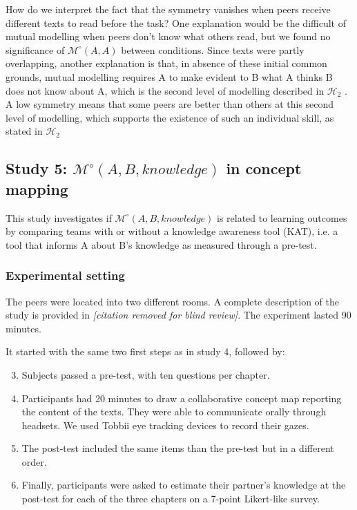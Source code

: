 \documentclass[natbib]{svjour3}
\newcommand{\ie}{i.e.\xspace}
\newcommand{\A}{A\xspace}
\newcommand{\B}{B\xspace}
\newcommand{\Model}[3]{{$\mathcal{M}^{\circ}(#1, #2, #3)$}}
\newcommand{\gModel}[2]{{$\mathcal{M}^{\circ}(#1, #2)$}}
\begin{document}
How do we interpret the fact that the symmetry vanishes when peers receive
different texts to read before the task? One explanation would be the difficult
of mutual modelling when peers don't know what others read, but we found no
significance of \gModel{A}{A} between conditions. Since texts were partly
overlapping, another explanation is that, in absence of these initial common
grounds, mutual modelling requires \A to make evident to \B what \A thinks \B does
not know about A, which is the second level of modelling described in
$\mathcal{H}_{2}$ . A low symmetry means that some peers are better than others
at this second level of modelling, which supports the existence of such an
individual skill, as stated in  $\mathcal{H}_{2}$ 

\subsection{{\bf Study 5}: \Model{A}{B}{knowledge} in concept mapping}

This study investigates if \Model{A}{B}{knowledge} is related to learning
outcomes by comparing teams with or without a knowledge awareness tool (KAT),
\ie a tool that informs \A about \B's knowledge as measured through a pre-test.

\subsubsection*{Experimental setting}

The peers were located into two different rooms. A complete description of the
study is provided in \textit{[citation removed for blind review]}. The experiment lasted 90 minutes.

It started with the same two first steps as in study 4, followed by:

\begin{enumerate}
    \setcounter{enumi}{2}

    \item Subjects passed a pre-test, with ten questions per chapter. 

    \item Participants had 20 minutes to draw a collaborative concept map
        reporting the content of the texts. They were able to communicate
        orally through headsets.  We used Tobbii eye tracking devices to
        record their gazes.

    \item The post-test included the same items than the pre-test but in a
        different order. 

    \item  Finally, participants were asked to estimate their partner's
        knowledge at the post-test for each of the three chapters on a 7-point
        Likert-like survey. 

\end{enumerate}
\end{document}
